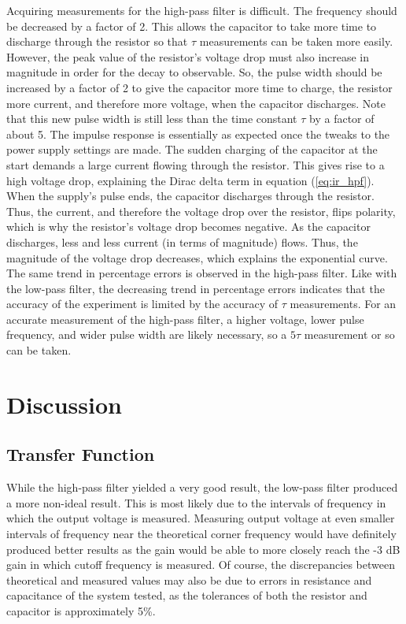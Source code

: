 \documentclass{article}
\begin{document}
	Acquiring measurements for the high-pass filter is difficult. The frequency should be decreased by a factor of 2. This allows the capacitor to take more time to discharge through the resistor so that $\tau$ measurements can be taken more easily. However, the peak value of the resistor's voltage drop must also increase in magnitude in order for the decay to observable. So, the pulse width should be increased by a factor of 2 to give the capacitor more time to charge, the resistor more current, and therefore more voltage, when the capacitor discharges. Note that this new pulse width is still less than the time constant $\tau$ by a factor of about 5.
	The impulse response is essentially as expected once the tweaks to the power supply settings are made. The sudden charging of the capacitor at the start demands a large current flowing through the resistor. This gives rise to a high voltage drop, explaining the Dirac delta term in equation (\ref{eq:ir_hpf}).
	When the supply's pulse ends, the capacitor discharges through the resistor. Thus, the current, and therefore the voltage drop over the resistor, flips polarity, which is why the resistor's voltage drop becomes negative. As the capacitor discharges, less and less current (in terms of magnitude) flows. Thus, the magnitude of the voltage drop decreases, which explains the exponential curve.
	The same trend in percentage errors is observed in the high-pass filter. Like with the low-pass filter, the decreasing trend in percentage errors indicates that the accuracy of the experiment is limited by the accuracy of $\tau$ measurements. For an accurate measurement of the high-pass filter, a higher voltage, lower pulse frequency, and wider pulse width are likely necessary, so a $5\tau$ measurement or so can be taken.
	
	\section{Discussion}
	\subsection{Transfer Function}
	While the high-pass filter yielded a very good result, the low-pass filter produced a more non-ideal result. This is most likely due to the intervals of frequency in which the output voltage is measured. Measuring output voltage at even smaller intervals of frequency near the theoretical corner frequency would have definitely produced better results as the gain would be able to more closely reach the -3 dB gain in which cutoff frequency is measured. Of course, the discrepancies between theoretical and measured values may also be due to errors in resistance and capacitance of the system tested, as the tolerances of both the resistor and capacitor is approximately 5\%. 
\end{document}
